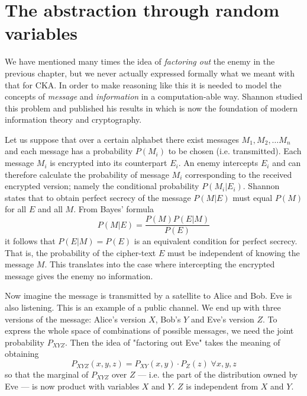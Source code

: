\label{ch:three}

\section{The abstraction through random variables}
    We have mentioned many times the idea of \textit{factoring out} the enemy in the previous chapter, but we never actually expressed formally what we meant with that for CKA.
    In order to make reasoning like this it is needed to model the concepts of \textit{message} and \textit{information} in a computation-able way.
    Shannon studied this problem and published his results in \cite{Shannon49} which is now the foundation of modern information theory and cryptography.
    
    Let us suppose that over a certain alphabet there exist messages $M_1,M_2,\ldots M_n$ and each message has a probability $P(M_i)$ to be chosen (i.e. transmitted).
    Each message $M_i$ is encrypted into its counterpart $E_i$.
    An enemy intercepts $E_i$ and can therefore calculate the probability of message $M_i$ corresponding to the received encrypted version; namely the conditional probability $P(M_i|E_i)$.
    Shannon states that to obtain perfect secrecy of the message $P(M|E)$ must equal $P(M)$ for all $E$ and all $M$.
    From Bayes' formula
    \begin{equation}
    	P(M|E) = \frac{P(M)P(E|M)}{P(E)}
    \end{equation}
    it follows that $P(E|M)=P(E)$ is an equivalent condition for perfect secrecy.
    That is, the probability of the cipher-text $E$ must be independent of knowing the message $M$.
    This translates into the case where intercepting the encrypted message gives the enemy no information. 
    
    Now imagine the message is transmitted by a satellite to Alice and Bob.
    Eve is also listening. This is an example of a public channel.
    We end up with three versions of the message\footnotemark : Alice's version $X$, Bob's $Y$ and Eve's version $Z$.
    To express the whole space of combinations of possible messages, we need the joint probability $P_{XYZ}$.
    Then the idea of "factoring out Eve" takes the meaning of obtaining 
    \begin{equation}
    	P_{XYZ}(x,y,z) = P_{XY}(x,y)\cdot P_Z(z) \; \forall x,y,z
    \end{equation}
    so that the marginal of $P_{XYZ}$ over $Z$ --- i.e. the part of the distribution owned by Eve --- is now product with variables $X$ and $Y$. $Z$ is independent from $X$ and $Y$.
    
